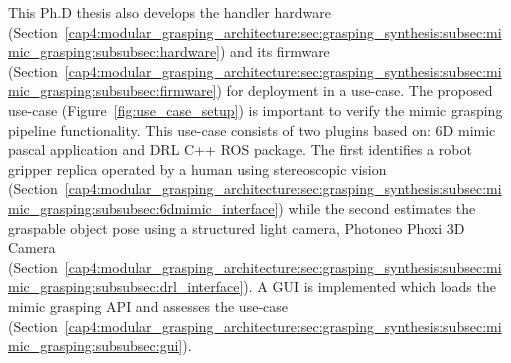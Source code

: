 This Ph.D thesis also develops the handler hardware (Section~\ref{cap4:modular_grasping_architecture:sec:grasping_synthesis:subsec:mimic_grasping:subsubsec:hardware}) and its firmware (Section~\ref{cap4:modular_grasping_architecture:sec:grasping_synthesis:subsec:mimic_grasping:subsubsec:firmware}) for deployment in a use-case. The proposed use-case (Figure~\ref{fig:use_case_setup}) is important to verify the mimic grasping pipeline functionality. This use-case consists of two plugins based on: 6D mimic pascal application and \ac{DRL} C++ \ac{ROS} package. The first identifies a robot gripper replica operated by a human using stereoscopic vision (Section~\ref{cap4:modular_grasping_architecture:sec:grasping_synthesis:subsec:mimic_grasping:subsubsec:6dmimic_interface}) while the second estimates the graspable object pose using a structured light camera, Photoneo Phoxi 3D Camera~\cite{photoneo} (Section~\ref{cap4:modular_grasping_architecture:sec:grasping_synthesis:subsec:mimic_grasping:subsubsec:drl_interface}). A \ac{GUI} is implemented which loads the mimic grasping API and assesses the use-case (Section~\ref{cap4:modular_grasping_architecture:sec:grasping_synthesis:subsec:mimic_grasping:subsubsec:gui}).

\begin{figure}[h!]
\end{figure}




